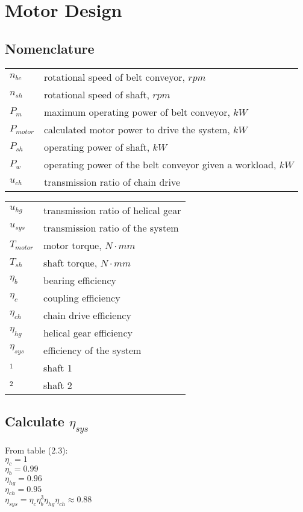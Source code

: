 \chapter{Motor Design}
\section{Nomenclature}
\begin{tabular}[t]{lp{6cm}}
	$ n_{bc} $ & rotational speed of belt conveyor, $ \unit{rpm} $\\
	$ n_{sh} $ & rotational speed of shaft, $ \unit{rpm} $\\
	$ P_m $ & maximum operating power of belt conveyor, $ \unit{kW} $\\
	$ P_{motor} $ & calculated motor power to drive the system, $ \unit{kW} $\\
	$ P_{sh} $ & operating power of shaft, $ \unit{kW} $\\
	$ P_w $ & operating power of the belt conveyor given a workload, $ \unit{kW} $\\
	$ u_{ch} $ & transmission ratio of chain drive\\
\end{tabular}
\begin{tabular}[t]{lp{6cm}}
	$ u_{hg} $ & transmission ratio of helical gear\\
	$ u_{sys} $ & transmission ratio of the system\\
	$ T_{motor} $ & motor torque, $ \unit{N\cdot mm} $\\
	$ T_{sh} $ & shaft torque, $ \unit{N\cdot mm} $\\
	$ \eta_b $ & bearing efficiency\\
	$ \eta_c $ & coupling efficiency\\
	$ \eta_{ch} $ & chain drive efficiency\\
	$ \eta_{hg} $ & helical gear efficiency\\
	$ \eta_{sys} $ & efficiency of the system\\
	$ _1 $ & shaft 1\\
	$ _2 $ & shaft 2\\
\end{tabular}

\section{Calculate $ \eta_{sys} $}
From table (2.3):\\
$ \eta_c = 1 $\\
$ \eta_b = 0.99 $\\
$ \eta_{hg} = 0.96 $\\
$ \eta_{ch} = 0.95 $\\
$ \eta_{sys} = \eta_c\eta_b^3\eta_{hg}\eta_{ch} \approx 0.88 $

